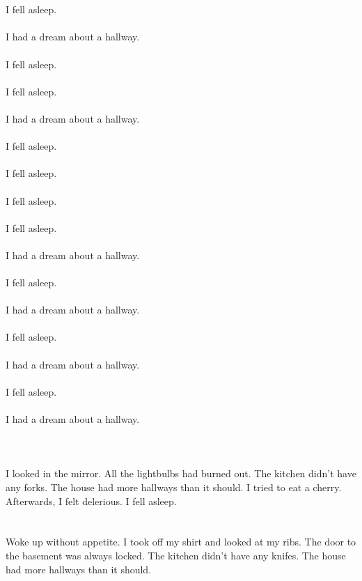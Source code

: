 \documentclass{article}
\begin{document}
    \section{}
    I fell asleep.\\\\I had a dream about a hallway.\\\\ I fell asleep.\\\\ I fell asleep.\\\\I had a dream about a hallway.\\\\ I fell asleep.\\\\ I fell asleep.\\\\ I fell asleep.\\\\ I fell asleep.\\\\I had a dream about a hallway.\\\\ I fell asleep.\\\\I had a dream about a hallway.\\\\ I fell asleep.\\\\I had a dream about a hallway.\\\\ I fell asleep.\\\\I had a dream about a hallway.\\\\ 
    \newpage
    
    \section{}
    I looked in the mirror. All the lightbulbs had burned out. The kitchen didn't have any forks. The house had more hallways than it should. I tried to eat a cherry. Afterwards, I felt delerious. I fell asleep.  
    \newpage
    
    \section{}
    Woke up without appetite. I took off my shirt and looked at my ribs. The door to the basement was always locked. The kitchen didn't have any knifes. The house had more hallways than it should.  
    \newpage
    
\end{document}
